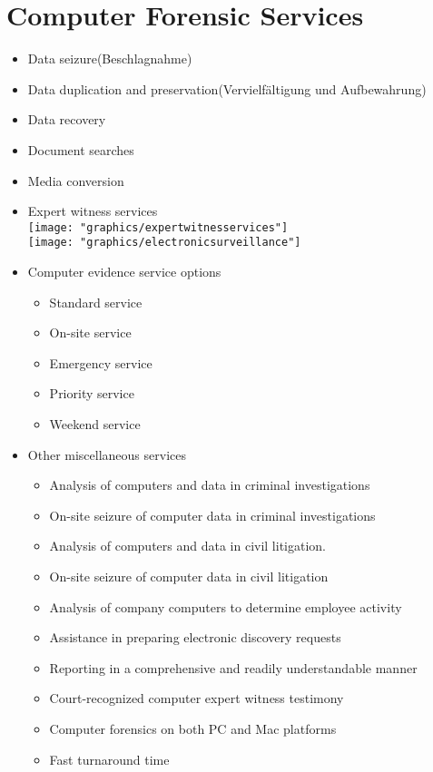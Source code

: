 \documentclass{scrreprt}
\begin{document}
\section{Computer Forensic Services}
\begin{itemize}
\item Data seizure(Beschlagnahme)
\item Data duplication and preservation(Vervielfältigung und Aufbewahrung)
\item Data recovery
\item Document searches
\item Media conversion
\item Expert witness services
\\\texttt{[image: "graphics/expertwitnesservices"]}
\\\texttt{[image: "graphics/electronicsurveillance"]}
\item Computer evidence service options
\begin{itemize}
\item Standard service
\item On-site service
\item Emergency service
\item Priority service
\item Weekend service
\end{itemize}
\item Other miscellaneous services
\begin{itemize}
\item Analysis of computers and data in criminal investigations
\item On-site seizure of computer data in criminal investigations
\item Analysis of computers and data in civil litigation.
\item On-site seizure of computer data in civil litigation
\item Analysis of company computers to determine employee activity
\item Assistance in preparing electronic discovery requests
\item Reporting in a comprehensive and readily understandable manner
\item Court-recognized computer expert witness testimony
\item Computer forensics on both PC and Mac platforms
\item Fast turnaround time
\end{itemize}
\end{itemize}
\end{document}
